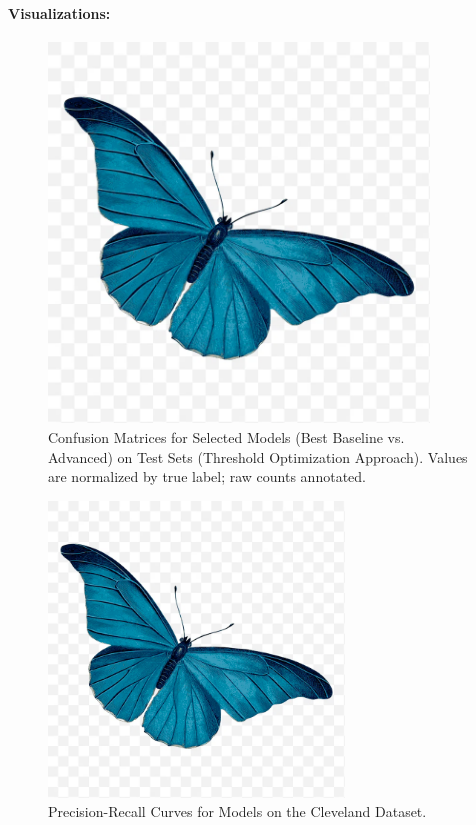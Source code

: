 \documentclass{article}
\begin{document}
\paragraph{Visualizations:}

\begin{figure}[htbp] %
    \centering
    \includegraphics[width=0.9\textwidth]{cm-grid.png}
    \caption{Confusion Matrices for Selected Models (Best Baseline vs. Advanced) on Test Sets (Threshold Optimization Approach). Values are normalized by true label; raw counts annotated.}
    \label{fig:confusion_matrices}
\end{figure}

\begin{figure}[htbp] %
    \centering
    \includegraphics[width=0.7\textwidth]{pr-curve-cleveland.png}
    \caption{Precision-Recall Curves for Models on the Cleveland Dataset.}
    \label{fig:pr_cleveland}
\end{figure}
\end{document}
